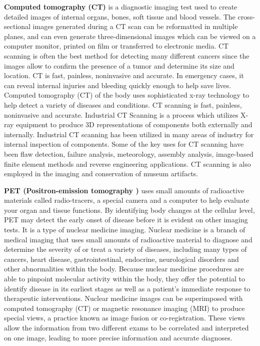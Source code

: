 \textbf{  Computed tomography (CT) } is a diagnostic imaging test used to create detailed images of internal organs, bones, soft tissue and blood vessels. The cross-sectional images generated during a CT scan can be reformatted in multiple planes, and can even generate three-dimensional images which can be viewed on a computer monitor, printed on film or transferred to electronic media. CT scanning is often the best method for detecting many different cancers since the images allow to confirm the presence of a tumor and determine its size and location. CT is fast, painless, noninvasive and accurate. In emergency cases, it can reveal internal injuries and bleeding quickly enough to help save lives. \newline Computed tomography (CT) of the body uses sophisticated x-ray technology to help detect a variety of diseases and conditions. CT scanning is fast, painless, noninvasive and accurate.  Industrial CT Scanning  is a process which utilizes X-ray equipment to produce 3D representations of components both externally and internally. Industrial CT scanning has been utilized in many areas of industry for internal inspection of components. Some of the key uses for CT scanning have been flaw detection, failure analysis, meteorology, assembly analysis, image-based finite element methods and reverse engineering applications. CT scanning is also employed in the imaging and conservation of museum artifacts.


 \textbf{PET (Positron-emission tomography ) } uses small amounts of radioactive materials called radio-tracers, a special camera and a computer to help evaluate your organ and tissue functions. By identifying body changes at the cellular level, PET may detect the early onset of disease before it is evident on other imaging tests. It is a type of nuclear medicine imaging. Nuclear medicine is a branch of medical imaging that uses small amounts of radioactive material to diagnose and determine the severity of or treat a variety of diseases, including many types of cancers, heart disease, gastrointestinal, endocrine, neurological disorders and other abnormalities within the body. Because nuclear medicine procedures are able to pinpoint molecular activity within the body, they offer the potential to identify disease in its earliest stages as well as a patient's immediate response to therapeutic interventions. Nuclear medicine images can be superimposed with computed tomography (CT) or magnetic resonance imaging (MRI) to produce special views, a practice known as image fusion or co-registration. These views allow the information from two different exams to be correlated and interpreted on one image, leading to more precise information and accurate diagnoses.


